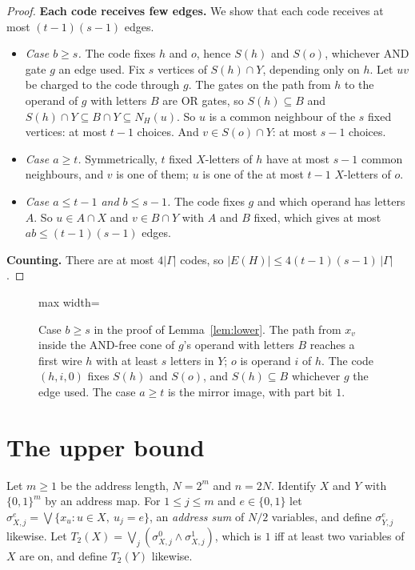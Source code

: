 \documentclass[11pt]{article}
\theoremstyle{definition}
\theoremstyle{remark}
\begin{document}
\begin{proof}
\textbf{Each code receives few edges.} We show that each code receives at most $(t-1)(s-1)$ edges.
\begin{itemize}
\item \emph{Case $b\ge s$.} The code fixes $h$ and $o$, hence $S(h)$ and $S(o)$, whichever AND gate $g$ an edge used.
Fix $s$ vertices of $S(h)\cap Y$, depending only on $h$. Let $uv$ be charged to the code through $g$. The gates on the
path from $h$ to the operand of $g$ with letters $B$ are OR gates, so $S(h)\subseteq B$ and
$S(h)\cap Y\subseteq B\cap Y\subseteq N_H(u)$. So $u$ is a common neighbour of the $s$ fixed vertices: at most $t-1$
choices. And $v\in S(o)\cap Y$: at most $s-1$ choices.
\item \emph{Case $a\ge t$.} Symmetrically, $t$ fixed $X$-letters of $h$ have at most $s-1$ common neighbours, and $v$
is one of them; $u$ is one of the at most $t-1$ $X$-letters of $o$.
\item \emph{Case $a\le t-1$ and $b\le s-1$.} The code fixes $g$ and which operand has letters $A$. So $u\in A\cap X$
and $v\in B\cap Y$ with $A$ and $B$ fixed, which gives at most $ab\le(t-1)(s-1)$ edges.
\end{itemize}

\textbf{Counting.} There are at most $4|\Gamma|$ codes, so $|E(H)|\le 4(t-1)(s-1)\,|\Gamma|$.
\end{proof}

\begin{figure}[t]
\centering
\begin{adjustbox}{max width=\linewidth}

\end{adjustbox}
\caption{Case $b\ge s$ in the proof of Lemma~\ref{lem:lower}. The path from $x_v$ inside the AND-free cone of $g$'s
operand with letters $B$ reaches a first wire $h$ with at least $s$ letters in $Y$; $o$ is operand $i$ of $h$. The code
$(h,i,0)$ fixes $S(h)$ and $S(o)$, and $S(h)\subseteq B$ whichever $g$ the edge used. The case $a\ge t$ is the mirror
image, with part bit $1$.}\label{fig:charging}
\end{figure}

\section{The upper bound}

Let $m\ge 1$ be the address length, $N=2^m$ and $n=2N$. Identify $X$ and $Y$ with $\{0,1\}^m$ by an address map. For
$1\le j\le m$ and $e\in\{0,1\}$ let $\sigma^{e}_{X,j}=\bigvee\{x_u: u\in X,\ u_j=e\}$, an \emph{address sum} of $N/2$
variables, and define $\sigma^e_{Y,j}$ likewise. Let $T_2(X)=\bigvee_j (\sigma^0_{X,j}\wedge \sigma^1_{X,j})$, which is
$1$ iff at least two variables of $X$ are on, and define $T_2(Y)$ likewise.
\end{document}
